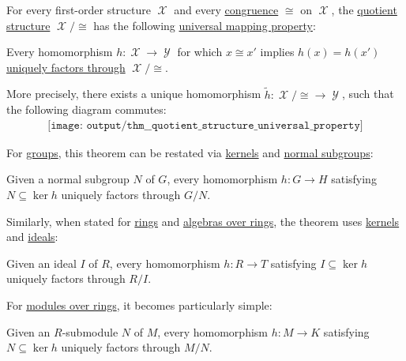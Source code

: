 \begin{theorem}\label{thm:quotient_structure_universal_property}
  For every first-order structure \( \mscrX \) and every \hyperref[def:first_order_congruence]{congruence} \( \cong \) on \( \mscrX \), the \hyperref[def:first_order_quotient]{quotient structure} \( \mscrX / {\cong} \) has the following \hyperref[rem:universal_mapping_property]{universal mapping property}:
  \begin{displayquote}
    Every homomorphism \( h: \mscrX \to \mscrY \) for which \( x \cong x' \) implies \( h(x) = h(x') \) \hyperref[def:factors_through]{uniquely factors through} \( \mscrX / {\cong} \).

    More precisely, there exists a unique homomorphism \( \widetilde{h}: \mscrX / {\cong} \to \mscrY \), such that the following diagram commutes:
    \begin{equation}\label{eq:thm:quotient_structure_universal_property/diagram}
      \begin{aligned}
        \texttt{[image: output/thm\_\_quotient\_structure\_universal\_property]}
      \end{aligned}
    \end{equation}
  \end{displayquote}
\end{theorem}
\begin{comments}
  \item For \hyperref[def:group]{groups}, this theorem can be restated via \hyperref[def:group/kernel]{kernels} and \hyperref[def:normal_subgroup]{normal subgroups}:
  \begin{displayquote}
    Given a normal subgroup \( N \) of \( G \), every homomorphism \( h: G \to H \) satisfying \( N \subseteq \ker h \) uniquely factors through \( G / N \).
  \end{displayquote}

  Similarly, when stated for \hyperref[def:ring]{rings} and \hyperref[def:algebra_over_ring]{algebras over rings}, the theorem uses \hyperref[def:ring/kernel]{kernels} and \hyperref[def:semiring_ideal]{ideals}:
  \begin{displayquote}
    Given an ideal \( I \) of \( R \), every homomorphism \( h: R \to T \) satisfying \( I \subseteq \ker h \) uniquely factors through \( R / I \).
  \end{displayquote}

  For \hyperref[def:module]{modules over rings}, it becomes particularly simple:
  \begin{displayquote}
    Given an \( R \)-submodule \( N \) of \( M \), every homomorphism \( h: M \to K \) satisfying \( N \subseteq \ker h \) uniquely factors through \( M / N \).
  \end{displayquote}
\end{comments}
